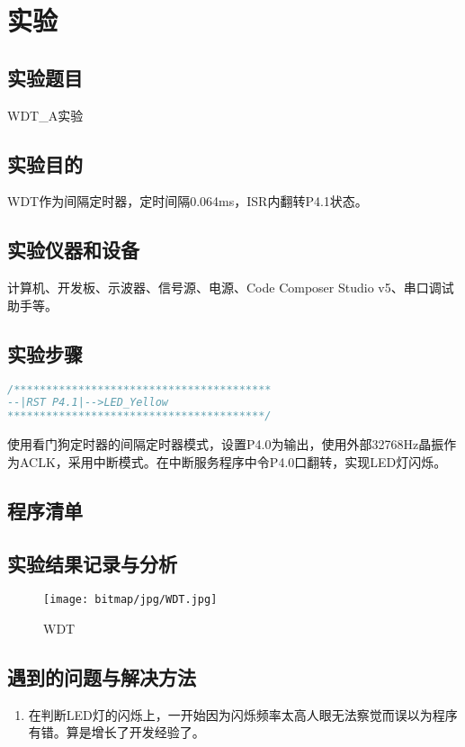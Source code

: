 \section{实验}
\subsection{实验题目}
WDT\_A实验
\subsection{实验目的}
WDT作为间隔定时器，定时间隔0.064ms，ISR内翻转P4.1状态。
\subsection{实验仪器和设备}
计算机、开发板、示波器、信号源、电源、Code Composer Studio v5、串口调试助手等。
\subsection{实验步骤}
\begin{lstlisting}[language=C]
/****************************************
--|RST P4.1|-->LED_Yellow
****************************************/
\end{lstlisting}
\par\indent 
使用看门狗定时器的间隔定时器模式，设置P4.0为输出，使用外部32768Hz晶振作为ACLK，采用中断模式。在中断服务程序中令P4.0口翻转，实现LED灯闪烁。
\subsection{程序清单}

\subsection{实验结果记录与分析}
\begin{figure}[htbp]
	\centering
	\caption{WDT}
	\label{WDT}
	\texttt{[image: bitmap/jpg/WDT.jpg]}
\end{figure}
\subsection{遇到的问题与解决方法}
\begin{enumerate}
	\item 在判断LED灯的闪烁上，一开始因为闪烁频率太高人眼无法察觉而误以为程序有错。算是增长了开发经验了。
\end{enumerate}

